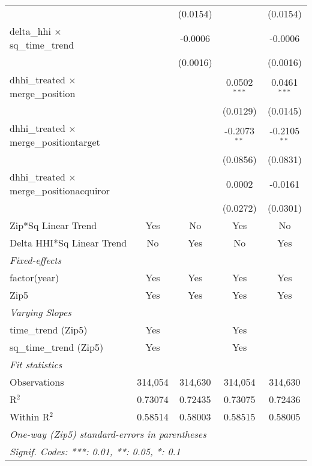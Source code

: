 \begin{table}[H]
{\begin{tabular}{lcccc}
   &   & (0.0154) &    & (0.0154)\\ 

 delta\_hhi $\times $ sq\_time\_trend&   & -0.0006 &    & -0.0006\\ 

   &   & (0.0016) &    & (0.0016)\\ 

 dhhi\_treated $\times $ merge\_position&   &    & 0.0502$^{***}$ & 0.0461$^{***}$\\ 

   &   &    & (0.0129) & (0.0145)\\ 

 dhhi\_treated $\times $ merge\_positiontarget&   &    & -0.2073$^{**}$ & -0.2105$^{**}$\\ 

   &   &    & (0.0856) & (0.0831)\\ 

 dhhi\_treated $\times $ merge\_positionacquiror&   &    & 0.0002 & -0.0161\\ 

   &   &    & (0.0272) & (0.0301)\\ 

 Zip*Sq Linear Trend & Yes & No & Yes & No\\ 

 Delta HHI*Sq Linear Trend & No & Yes & No & Yes\\ 

 \midrule \emph{Fixed-effects}&   &   &   &  \\ 

 factor(year) & Yes & Yes & Yes & Yes\\ 

 Zip5 & Yes & Yes & Yes & Yes\\ 

 \midrule \emph{Varying Slopes}&   &   &   &  \\ 

 time\_trend (Zip5) & Yes &  & Yes & \\ 

 sq\_time\_trend (Zip5) & Yes &  & Yes & \\ 

 \midrule \emph{Fit statistics}&  & & & \\ 

 Observations & 314,054&314,630&314,054&314,630\\ 

 R$^2$ & 0.73074&0.72435&0.73075&0.72436\\ 

 Within R$^2$ & 0.58514&0.58003&0.58515&0.58005\\ 

 \midrule\midrule\multicolumn{5}{l}{\emph{One-way (Zip5) standard-errors in parentheses}}\\ 

 \multicolumn{5}{l}{\emph{Signif. Codes: ***: 0.01, **: 0.05, *: 0.1}}\\ 

 \end{tabular}} 

 \end{table} 


